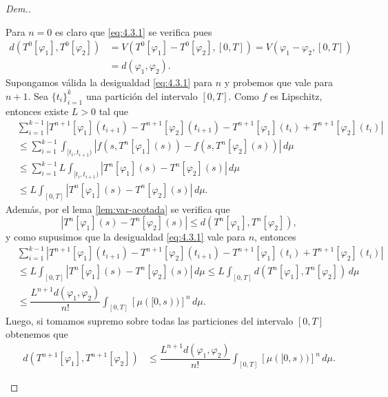 \begin{proof}[Dem.]
\begin{enumerate}
Para $n=0$ es claro que \eqref{eq:4.3.1} se verifica pues
\begin{equation*}
    \begin{split}
d(T^0[\varphi_1],T^0[\varphi_2])&=V(T^0[\varphi_1]-T^0[\varphi_2],[0,T])=V(\varphi_1-\varphi_2,[0,T])\\ & =d(\varphi_1,\varphi_2).
\end{split}
\end{equation*}
Supongamos válida la desigualdad \eqref{eq:4.3.1} para $n$ y probemos que vale para $n+1$.
Sea $\{t_i\}_{i=1}^k$ una partición del intervalo $[0,T]$. Como $f$ es Lipschitz, entonces existe $L>0$ tal que
\begin{equation*}
    \begin{split}
        &\sum_{i=1}^{k-1}\left|T^{n+1}[\varphi_1](t_{i+1})-T^{n+1}[\varphi_2](t_{i+1})-T^{n+1}[\varphi_1](t_{i})+T^{n+1}[\varphi_2](t_{i})  \right|\\
        &\leq \sum_{i=1}^{k-1}\int_{[t_i,t_{i+1})}\left| f(s,T^n[\varphi_1](s))-f(s,T^n[\varphi_2](s))  \right|\, d\mu\\
        &\leq \sum_{i=1}^{k-1}L\int_{[t_i,t_{i+1})}\left| T^n[\varphi_1](s)-T^n[\varphi_2](s)  \right|\, d\mu \\ 
        &\leq L\int_{[0,T]}\left| T^n[\varphi_1](s)-T^n[\varphi_2](s)  \right|\, d\mu.
    \end{split}
\end{equation*}
Además, por el lema \ref{lem:var-acotada} se verifica que 
$$|T^n[\varphi_1](s)-T^n[\varphi_2](s)|\leq d(T^n[\varphi_1],T^n[\varphi_2]),$$
y como supusimos que la desigualdad \eqref{eq:4.3.1} 
vale para $n$, entonces
\begin{equation*}
    \begin{split}
        &\sum_{i=1}^{k-1}\left|T^{n+1}[\varphi_1](t_{i+1})-T^{n+1}[\varphi_2](t_{i+1})-T^{n+1}[\varphi_1](t_{i})+T^{n+1}[\varphi_2](t_{i})  \right|\\
        &\leq L\int_{[0,T]}\left| T^n[\varphi_1](s)-T^n[\varphi_2](s)  \right|\, d\mu \leq L\int_{[0,T]}d(T^n[\varphi_1],T^n[\varphi_2])\, d\mu \\ &\leq \dfrac{L^{n+1}d(\varphi_1,\varphi_2)}{n!}\int_{[0,T]}\left[\mu([0,s))\right]^n\, d\mu.
    \end{split}
\end{equation*}
Luego, si tomamos supremo sobre todas las particiones del intervalo $[0,T]$ obtenemos que
\begin{equation*}
    \begin{split}
d(T^{n+1}[\varphi_1],T^{n+1}[\varphi_2]) &\leq \dfrac{L^{n+1}d(\varphi_1,\varphi_2)}{n!}\int_{[0,T]}\left[\mu([0,s))\right]^n\, d\mu.

\end{split}
\end{equation*}
\end{enumerate}
\end{proof}
